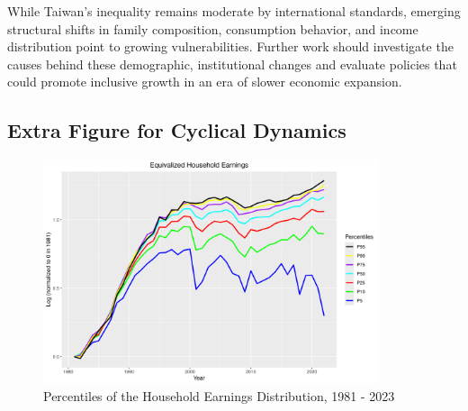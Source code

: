 \documentclass{article}
\begin{document}
While Taiwan's inequality remains moderate by international standards, emerging structural shifts in family composition, consumption behavior, and income distribution point to growing vulnerabilities. Further work should investigate the causes behind these demographic, institutional changes and evaluate policies that could promote inclusive growth in an era of slower economic expansion.




\printbibliography

\newpage
\begin{appendices}
\section{Extra Figure for Cyclical Dynamics}
\label{sec:appendix_cyclical_dynamics}

\vspace{2em}

\begin{figure}[ht]
    \centering
    \includegraphics[width=0.88\textwidth]{figures/Fig_2/Fig_2_percentiles_1981.png}
    \caption{Percentiles of the Household Earnings Distribution, 1981 - 2023}
    \label{fig:appendix_cyclic_earnings_1981}
\end{figure}

\vspace{4em} 


\end{appendices}
\end{document}
